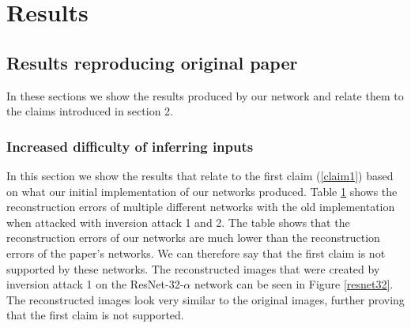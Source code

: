 \begin{table}[!htb]
\begin{minipage}{.45\linewidth}
{\begin{tabular}{l|c|c|c|c}
    \end{tabular}
    }
    
    \label{inversion-table}
    \end{minipage} 
\end{table}

\section{Results}
\label{sec:results}

\subsection{Results reproducing original paper}
In these sections we show the results produced by our network and relate them to the claims introduced in section 2.

\subsubsection{Increased difficulty of inferring inputs}
In this section we show the results that relate to the first claim (\ref{claim1}) based on what our initial implementation of our networks produced.
Table \ref{inversion-table} shows the reconstruction errors of multiple different networks with the old implementation when attacked with inversion attack 1 and 2. The table shows that the reconstruction errors of our networks are much lower than the reconstruction errors of the paper's networks. We can therefore say that the first claim is not supported by these networks.
The reconstructed images that were created by inversion attack 1 on the ResNet-32-$\alpha$ network can be seen in Figure \ref{resnet32}. The reconstructed images look very similar to the original images, further proving that the first claim is not supported.

